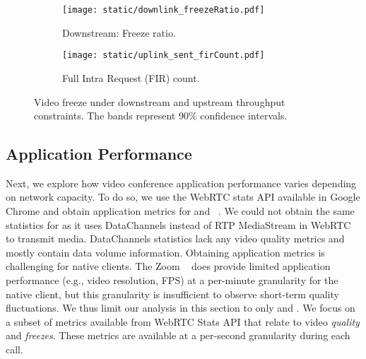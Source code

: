 \begin{figure}[t]
    \centering
    \begin{subfigure}[t]{0.4\textwidth}      
        \texttt{[image: static/downlink\_freezeRatio.pdf]}
        \vspace{-1em}
        \caption{Downstream: Freeze ratio.}
 		\label{subfig:downlink_freeze_ratio}
    \end{subfigure}
	\begin{subfigure}[t]{0.4\textwidth}   
        \centering
        \texttt{[image: static/uplink\_sent\_firCount.pdf]}
    \vspace{-1em}
    \caption{Full Intra Request (FIR) count.}
    \label{subfig:uplink_fir}
    \end{subfigure}%
    \vspace{-1em}
	\caption{Video freeze under downstream and upstream throughput constraints. The bands represent 90\% confidence intervals.%
	}
	\label{fig:video_freeze}
\end{figure}







\subsection{Application Performance}
\label{subsec:application_performance}

Next, we explore how video conference application performance varies depending
on network capacity.  To do so, we use the WebRTC stats API
available in Google Chrome and obtain application metrics for \teamsbrowser and
\meet~\cite{webrtc_stats}. We could not obtain the same statistics for
\zoombrowser as it uses DataChannels instead of RTP MediaStream in WebRTC to
transmit media. DataChannels statistics lack any video quality metrics and
mostly contain data volume information. Obtaining application metrics is
challenging for native clients. The Zoom ~\cite{zoom_qos} does provide limited
application performance (e.g., video resolution, FPS) at a per-minute
granularity for the native client, but this granularity is insufficient to
observe short-term quality fluctuations. We thus limit our analysis in this
section to only \meet and \teamsbrowser. We focus on a subset of metrics
available from WebRTC Stats API that relate to video \textit{quality} and
\textit{freezes}. These metrics are available at a per-second granularity
during each call. 

